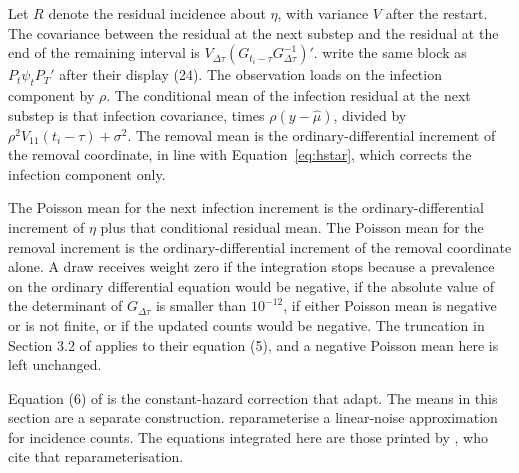 Let \(R\) denote the residual incidence about \(\eta\), with variance \(V\) after the restart. The covariance between the residual at the next substep and the residual at the end of the remaining interval is \(V_{\Delta\tau}(G_{t_i - \tau} G_{\Delta\tau}^{-1})'\). \citet[Section 3.1.2]{whitaker2017} write the same block as \(P_t\psi_t P_T'\) after their display (24). The observation loads on the infection component by \(\rho\). The conditional mean of the infection residual at the next substep is that infection covariance, times \(\rho(y - \hat{\mu})\), divided by \(\rho^{2} V_{11}(t_i - \tau) + \sigma^{2}\). The removal mean is the ordinary-differential increment of the removal coordinate, in line with Equation~\eqref{eq:hstar}, which corrects the infection component only.

The Poisson mean for the next infection increment is the ordinary-differential increment of \(\eta\) plus that conditional residual mean. The Poisson mean for the removal increment is the ordinary-differential increment of the removal coordinate alone. A draw receives weight zero if the integration stops because a prevalence on the ordinary differential equation would be negative, if the absolute value of the determinant of \(G_{\Delta\tau}\) is smaller than \(10^{-12}\), if either Poisson mean is negative or is not finite, or if the updated counts would be negative. The truncation in Section 3.2 of \citet{golightly2019} applies to their equation (5), and a negative Poisson mean here is left unchanged.

Equation (6) of \citet{golightly2018} is the constant-hazard correction that \citet{whitaker2025} adapt. The means in this section are a separate construction. \citet{fintzi2022} reparameterise a linear-noise approximation for incidence counts. The equations integrated here are those printed by \citet{golightly2023}, who cite that reparameterisation.
